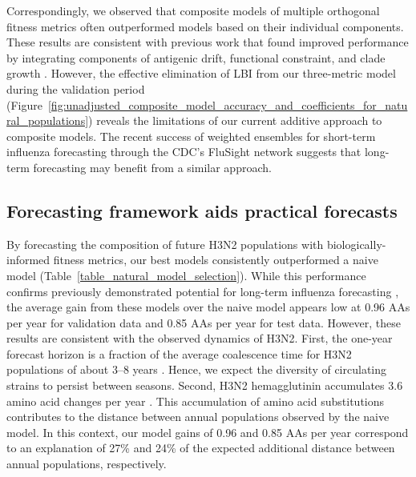 Correspondingly, we observed that composite models of multiple orthogonal fitness metrics often outperformed models based on their individual components.
These results are consistent with previous work that found improved performance by integrating components of antigenic drift, functional constraint, and clade growth \citep{Luksza:2014hj}.
However, the effective elimination of LBI from our three-metric model during the validation period (Figure~\ref{fig:unadjusted_composite_model_accuracy_and_coefficients_for_natural_populations}) reveals the limitations of our current additive approach to composite models.
The recent success of weighted ensembles for short-term influenza forecasting through the CDC's FluSight network \citep{Reich:2019bq} suggests that long-term forecasting may benefit from a similar approach.

\subsection{Forecasting framework aids practical forecasts}

By forecasting the composition of future H3N2 populations with biologically-informed fitness metrics, our best models consistently outperformed a naive model (Table~\ref{table_natural_model_selection}).
While this performance confirms previously demonstrated potential for long-term influenza forecasting \citep{Luksza:2014hj}, the average gain from these models over the naive model appears low at 0.96 AAs per year for validation data and 0.85 AAs per year for test data.
However, these results are consistent with the observed dynamics of H3N2.
First, the one-year forecast horizon is a fraction of the average coalescence time for H3N2 populations of about 3--8 years \citep{Rambaut:2008ew}.
Hence, we expect the diversity of circulating strains to persist between seasons.
Second, H3N2 hemagglutinin accumulates 3.6 amino acid changes per year \citep{Smith:2004jc}.
This accumulation of amino acid substitutions contributes to the distance between annual populations observed by the naive model.
In this context, our model gains of 0.96 and 0.85 AAs per year correspond to an explanation of 27\% and 24\% of the expected additional distance between annual populations, respectively.

